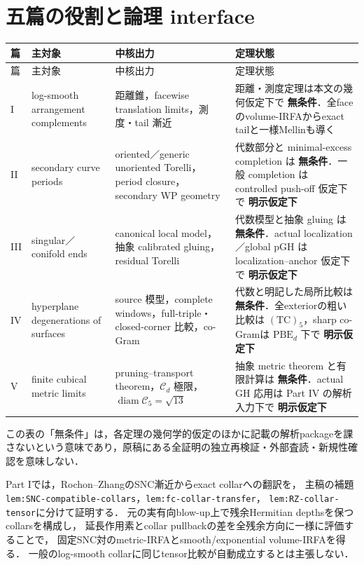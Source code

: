 \documentclass[a4paper,11pt]{ltjsarticle}
\numberwithin{equation}{section}
\theoremstyle{plain}
\theoremstyle{definition}
\theoremstyle{remark}
\newcommand{\cC}{\mathcal C}
\newcommand{\diam}{\operatorname{diam}}
\newcommand{\Safe}{\textcolor{safe}{\textbf{無条件}}}
\newcommand{\Conditional}{\textcolor{conditional}{\textbf{明示仮定下}}}
\begin{document}
\section{五篇の役割と論理 interface}

\begin{longtable}{@{}p{}p{}p{}p{}@{}}
\toprule
篇 & 主対象 & 中核出力 & 定理状態 \\
\midrule
\endfirsthead
\toprule
篇 & 主対象 & 中核出力 & 定理状態 \\
\midrule
\endhead
I & log-smooth arrangement complements & 距離錐，facewise translation limits，測度・tail 漸近 & 距離・測度定理は本文の幾何仮定下で \Safe．全faceのvolume-IRFAからexact tailと一様Mellinも導く \\
II & secondary curve periods & oriented／generic unoriented Torelli，period closure，secondary WP geometry & 代数部分と minimal-excess completion は \Safe．一般 completion は controlled push-off 仮定下で \Conditional \\
III & singular／conifold ends & canonical local model，抽象 calibrated gluing，residual Torelli & 代数模型と抽象 gluing は \Safe．actual localization／global pGH は localization--anchor 仮定下で \Conditional \\
IV & hyperplane degenerations of surfaces & source 模型，complete windows，full-triple・closed-corner 比較，co-Gram & 代数と明記した局所比較は \Safe．全exteriorの粗い比較は \(\mathrm{(TC)}_5\)，sharp co-Gramは \(\mathrm{PBE}_d\) 下で \Conditional \\
V & finite cubical metric limits & pruning--transport theorem，\(\cC_d\) 極限，\(\diam\cC_5=\sqrt{13}\) & 抽象 metric theorem と有限計算は \Safe．actual GH 応用は Part IV の解析入力下で \Conditional \\
\bottomrule
\end{longtable}

この表の「無条件」は，各定理の幾何学的仮定のほかに記載の解析packageを課さないという意味であり，原稿にある全証明の独立再検証・外部査読・新規性確認を意味しない．

Part Iでは，Rochon--ZhangのSNC漸近\cite[Theorem~5.1]{RZ}からexact collarへの翻訳を，
主稿の補題 \texttt{lem:SNC-compatible-collars}，\texttt{lem:fc-collar-transfer}，
\texttt{lem:RZ-collar-tensor}に分けて証明する．
元の実有向blow-up上で残余Hermitian depthsを保つcollarsを構成し，
延長作用素とcollar pullbackの差を全残余方向に一様に評価することで，
固定SNC対のmetric-IRFAとsmooth/exponential volume-IRFAを得る．
一般のlog-smooth collarに同じtensor比較が自動成立するとは主張しない．
\end{document}
